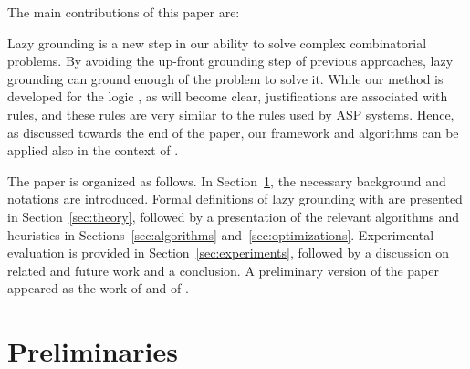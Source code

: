 \documentclass[11pt]{article}
\newcommand{\logicname}[1]{\text{\sc #1}\xspace}
\newcommand{\idp}{\logicname{IDP}}
\newcommand{\foid}{\logicname{FO(\ensuremath{ID})}}
\newcommand\getcitation[1]{\csuse{mycommoncitation#1}}
\newcommand\mycite[1]{\ifcsname mycommoncitation#1\endcsname \cite{\getcitation{#1}}\else \cite{#1}
  \fi }
\theoremstyle{plain}
\theoremstyle{definition}
\theoremstyle{example_basic}
\theoremstyle{example_contd}
\theoremstyle{plain}
\newcommand{\change}[1]{#1}
\begin{document}
\noindent The main contributions of this paper are:
\change{Lazy grounding is a new step in our ability to solve complex
combinatorial problems. By avoiding the up-front grounding step of previous
approaches, lazy grounding can ground enough of the problem to solve it.
While our method is developed for the logic \foid, as will become clear, justifications are associated with rules, and these rules are very similar to the rules used by ASP systems. Hence, as discussed towards the end of the paper, our framework and algorithms can be applied also in the context of \ASP.}

The paper is organized as follows. In Section~\ref{sec:preliminaries}, the necessary background and notations are introduced. Formal definitions of lazy grounding with \foid are presented in Section~\ref{sec:theory}, followed by a presentation of the relevant algorithms and heuristics in Sections~\ref{sec:algorithms} and~\ref{sec:optimizations}. Experimental evaluation is provided in Section~\ref{sec:experiments}, followed by a discussion on related and future work and a conclusion.
A preliminary version of the paper appeared as the work of
 and of .

 \section{Preliminaries}\label{sec:preliminaries}
\end{document}
